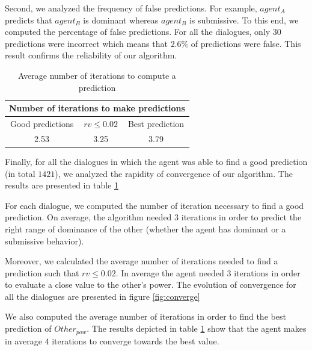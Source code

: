 \documentclass[sigconf]{aamas}  %
\begin{document}
	Second, we analyzed the frequency of false predictions. For example, $agent_A$ predicts that $agent_B$ is dominant whereas $agent_B$ is submissive. To this end, we computed the percentage of false predictions. For all the dialogues, only $30$ predictions were incorrect which means that $ 2.6 \% $ of predictions were false. This result confirms the reliability of our algorithm. 
	\begin{table}[t]
		\begin{tabular}{|c|c|c|}
			\hline
			\multicolumn{3}{|c|}{Number of iterations to make predictions} \\
			\hline
			Good predictions & $rv \leq 0.02$ & Best prediction \\
			\hline
			2.53 & 3.25 & 3.79\\
			\hline
		\end{tabular}
		\caption{Average number of iterations to compute a prediction} 
		\label{tab:conv}
	\end{table}
	Finally, for all the dialogues in which the agent was able to find a good prediction (in total $1421$), we analyzed the rapidity of convergence of our algorithm. The results are presented in table \ref{tab:conv}

	 
	For each dialogue, we computed the number of iteration necessary to find a good prediction. On average, the algorithm needed $3$ iterations in order to predict the right range of dominance of the other (whether the agent has dominant or a submissive behavior). 
	
	Moreover, we calculated the average number of iterations needed to find a prediction such that $rv \leq 0.02$. In average the agent needed $3$ iterations in order to evaluate a close value to the other's power. The evolution of convergence for all the dialogues are presented in figure  \ref{fig:converge}
	
	We  also computed the average number of iterations in order to find the best prediction of $Other_{pow}$. The results depicted in table \ref{tab:conv} show that the agent makes in average $4$ iterations to converge towards the best value.  

%			
	
\end{document}
